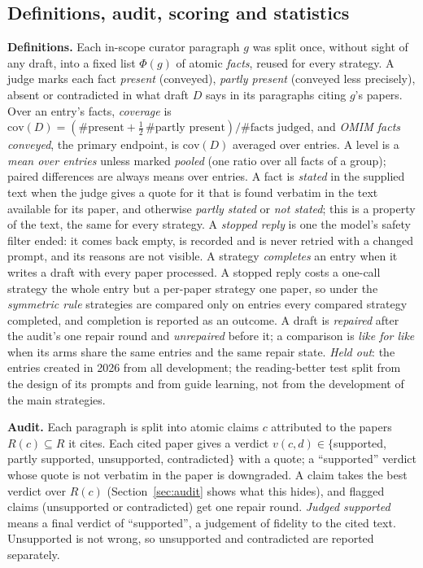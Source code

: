 \documentclass{article} %
\begin{document}
\subsection{Definitions, audit, scoring and statistics}
\label{sec:scoring}
\textbf{Definitions.} Each in-scope curator paragraph $g$ was split once, without sight of any draft, into a fixed list $\Phi(g)$ of atomic \emph{facts}, reused for every strategy. A judge marks each fact \emph{present} (conveyed), \emph{partly present} (conveyed less precisely), absent or contradicted in what draft $D$ says in its paragraphs citing $g$'s papers. Over an entry's facts, \emph{coverage} is $\mathrm{cov}(D)=(\#\text{present}+\tfrac12\,\#\text{partly present})/\#\text{facts judged}$, and \emph{OMIM facts conveyed}, the primary endpoint, is $\mathrm{cov}(D)$ averaged over entries. A level is a \emph{mean over entries} unless marked \emph{pooled} (one ratio over all facts of a group); paired differences are always means over entries. A fact is \emph{stated} in the supplied text when the judge gives a quote for it that is found verbatim in the text available for its paper, and otherwise \emph{partly stated} or \emph{not stated}; this is a property of the text, the same for every strategy. A \emph{stopped reply} is one the model's safety filter ended: it comes back empty, is recorded and is never retried with a changed prompt, and its reasons are not visible. A strategy \emph{completes} an entry when it writes a draft with every paper processed. A stopped reply costs a one-call strategy the whole entry but a per-paper strategy one paper, so under the \emph{symmetric rule} strategies are compared only on entries every compared strategy completed, and completion is reported as an outcome. A draft is \emph{repaired} after the audit's one repair round and \emph{unrepaired} before it; a comparison is \emph{like for like} when its arms share the same entries and the same repair state. \emph{Held out}: the entries created in 2026 from all development; the reading-better test split from the design of its prompts and from guide learning, not from the development of the main strategies.

\textbf{Audit.} Each paragraph is split into atomic claims $c$ attributed to the papers $R(c)\subseteq R$ it cites. Each cited paper gives a verdict $v(c,d)\in\{$supported, partly supported, unsupported, contradicted$\}$ with a quote; a ``supported'' verdict whose quote is not verbatim in the paper is downgraded. A claim takes the best verdict over $R(c)$ (Section~\ref{sec:audit} shows what this hides), and flagged claims (unsupported or contradicted) get one repair round. \emph{Judged supported} means a final verdict of ``supported'', a judgement of fidelity to the cited text. Unsupported is not wrong, so unsupported and contradicted are reported separately.
\end{document}
